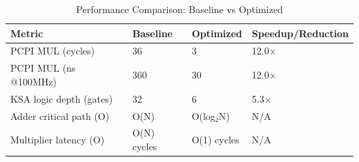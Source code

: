 \begin{table}[h]
\centering
\begin{tabular}{llll}
\hline
 Metric                  & Baseline    & Optimized   & Speedup/Reduction   \\
\hline
 PCPI MUL (cycles)       & 36          & 3           & 12.0×               \\
 PCPI MUL (ns @100MHz)   & 360         & 30          & 12.0×               \\
 KSA logic depth (gates) & 32          & 6           & 5.3×                \\
 Adder critical path (O) & O(N)        & O(log₂N)    & N/A                 \\
 Multiplier latency (O)  & O(N) cycles & O(1) cycles & N/A                 \\
\hline
\end{tabular}
\caption{Performance Comparison: Baseline vs Optimized}
\label{tab:perf_compare}
\end{table}
